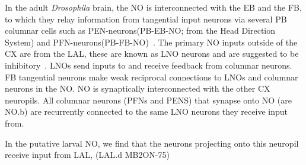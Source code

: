     In the adult \textit{Drosophila} brain, the NO is  interconnected with the EB and the FB, to which they relay information from tangential input neurons via several PB columnar cells such as PEN-neurons(PB-EB-NO; from the Head Direction System) and PFN-neurons(PB-FB-NO)~\citep{wolff2015neuroarchitecture, hulse2021connectome}. The primary NO inputs outside of the CX are from the LAL, these are known as LNO neurons and are suggested to be inhibitory~\citep{wolff2018neuroarchitecture,hulse2021connectome}. LNOs send inputs to and receive feedback from columnar neurons. %
    FB tangential neurons make weak reciprocal connections to LNOs and columnar neurons in the NO.
    NO is synaptically interconnected with the other CX neuropils. All columnar neurons (PFNs and PENS) that synapse onto NO (are NO.b) are recurrently connected to the same LNO neurons they receive input from. 


    In the putative larval NO, we find that the neurons projecting onto this neuropil receive input from LAL, (LAL.d MB2ON-75)





